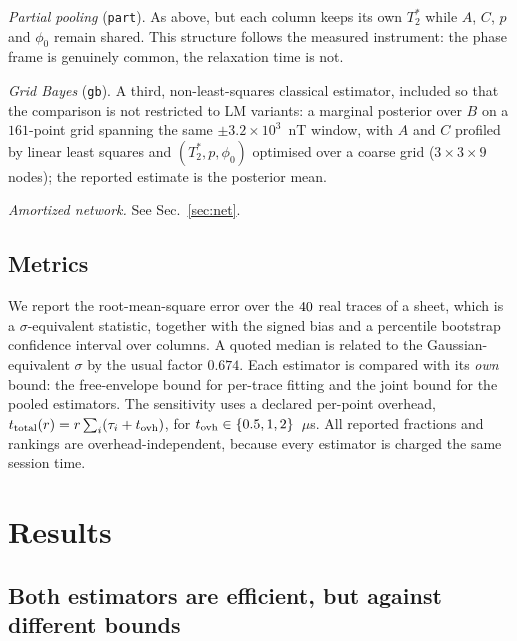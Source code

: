 \documentclass[aps,pra,twocolumn,superscriptaddress,nofootinbib]{revtex4-2}
\begin{document}
\emph{Partial pooling} (\texttt{part}). As above, but each column keeps its own $T_2^{*}$
while $A$, $C$, $p$ and $\phi_0$ remain shared. This structure follows the measured
instrument: the phase frame is genuinely common, the relaxation time is not.

\emph{Grid Bayes} (\texttt{gb}). A third, non-least-squares classical estimator, included so
that the comparison is not restricted to LM variants: a marginal posterior over $B$ on a
$161$-point grid spanning the same $\pm3.2\times10^{3}$~nT window, with $A$ and $C$ profiled
by linear least squares and $(T_2^{*},p,\phi_0)$ optimised over a coarse grid
($3\times3\times9$ nodes); the reported estimate is the posterior mean.

\emph{Amortized network.} See Sec.~\ref{sec:net}.

\subsection{Metrics}

We report the root-mean-square error over the $40$ real traces of a sheet, which is a
$\sigma$-equivalent statistic, together with the signed bias and a percentile bootstrap
confidence interval over columns. A quoted median is related to the Gaussian-equivalent
$\sigma$ by the usual factor $0.674$. Each estimator is compared with its \emph{own} bound:
the free-envelope bound for per-trace fitting and the joint bound for the pooled
estimators. The sensitivity uses a declared per-point overhead,
$t_{\rm total}(r)=r\sum_i(\tau_i+t_{\rm ovh})$, for $t_{\rm ovh}\in\{0.5,1,2\}$~$\mu$s.
All reported fractions and rankings are overhead-independent, because every estimator is
charged the same session time.

\section{Results}

\subsection{Both estimators are efficient, but against different bounds}
\end{document}
